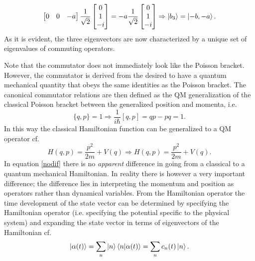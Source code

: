 \begin{example}
\begin{enumerate}
\begin{equation}
\begin{split}
\begin{bmatrix}
					0 & 0 & -a \\
				\end{bmatrix}\frac{1}{\sqrt{2}}
				\begin{bmatrix}
					0\\
					1\\
					-i\\
				\end{bmatrix}=
				-a\frac{1}{\sqrt{2}}
				\begin{bmatrix}
					0\\
					1\\
					-i\\
				\end{bmatrix}\Rightarrow\ket{b_3}=\ket{-b,-a}.
			\end{split}
		\end{equation} 
		As it is evident, the three eigenvectors are now characterized by a unique set of eigenvalues of commuting operators.	
	\end{enumerate}
\end{example}
Note that the commutator does not immediately look like the Poisson bracket. However, the commutator is derived from the desired to have a quantum mechanical quantity that obeys the same identities as the Poisson bracket. The canonical commutator relations are then defined as the QM generalization of the classical Poisson bracket between the generalized position and momenta,  i.e.
\begin{equation}
	\{q,p\}=1\Rightarrow \frac{1}{i\hbar}[q,p]=qp-pq=1.
\end{equation} 
In this way the classical Hamiltonian function can be generalized to a QM operator cf.
\begin{equation}
	H(q,p)=\frac{p^2}{2m}+V(q)\Rightarrow H(q,p)=\frac{p^2}{2m}+V(q).
	\label{nodif}
\end{equation} 
In equation \eqref{nodif} there is no \emph{apparent} difference in going from a classical to a quantum mechanical Hamiltonian. In reality there is however a very important difference; the difference lies in interpreting the momentum and position as operators rather than dynamical variables. From the Hamiltonian operator the time development of the state vector can be determined by specifying the Hamiltonian operator (i.e. specifying the potential specific to the physical system) and expanding the state vector in terms of eigenvectors of the Hamiltonian cf.
\begin{equation}
	\ket{\alpha(t)}=\sum_n\ket{n}\braket{n|\alpha(t)}=\sum_nc_n(t)\ket{n}.
\end{equation} 
